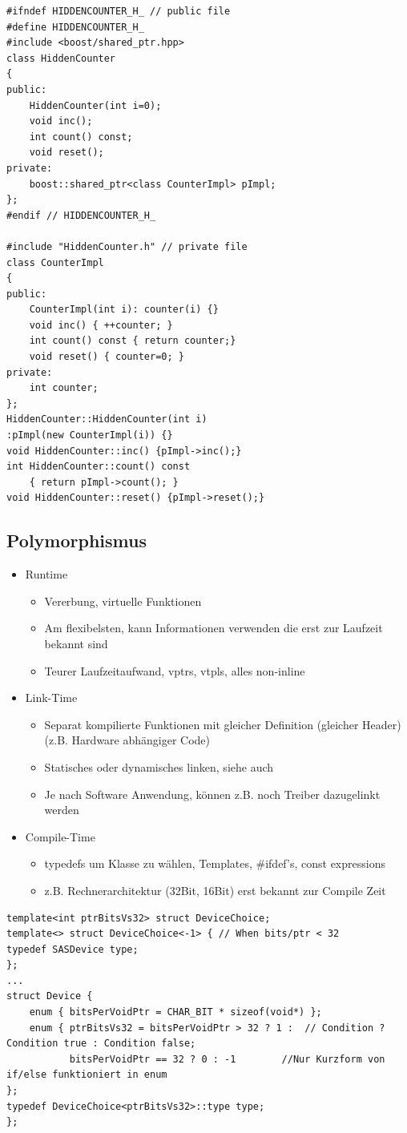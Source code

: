 \begin{lstlisting}
#ifndef HIDDENCOUNTER_H_ // public file
#define HIDDENCOUNTER_H_
#include <boost/shared_ptr.hpp>
class HiddenCounter
{
public:
	HiddenCounter(int i=0);
	void inc();
	int count() const;
	void reset();
private:
	boost::shared_ptr<class CounterImpl> pImpl;
};
#endif // HIDDENCOUNTER_H_

#include "HiddenCounter.h" // private file
class CounterImpl
{
public:
	CounterImpl(int i): counter(i) {}
	void inc() { ++counter; }
	int count() const { return counter;}
	void reset() { counter=0; }
private:
	int counter;
};
HiddenCounter::HiddenCounter(int i)
:pImpl(new CounterImpl(i)) {}
void HiddenCounter::inc() {pImpl->inc();}
int HiddenCounter::count() const
	{ return pImpl->count(); }
void HiddenCounter::reset() {pImpl->reset();}
\end{lstlisting}






\subsection{Polymorphismus}
\begin{itemize}
	\item Runtime
		\begin{itemize}
			\item Vererbung, virtuelle Funktionen
			\item Am flexibelsten, kann Informationen verwenden die erst zur Laufzeit bekannt sind
			\item Teurer Laufzeitaufwand, vptrs, vtpls, alles non-inline
		\end{itemize}
	\item Link-Time
		\begin{itemize}
			\item Separat kompilierte Funktionen mit gleicher Definition (gleicher Header) (z.B.
				Hardware abhängiger Code)
			\item Statisches oder dynamisches linken, siehe auch 
			\item Je nach Software Anwendung, können z.B. noch Treiber dazugelinkt werden
		\end{itemize}
	\item Compile-Time
		\begin{itemize}
			\item typedefs um Klasse zu wählen, Templates, \#ifdef's, const expressions
			\item z.B. Rechnerarchitektur (32Bit, 16Bit) erst bekannt zur Compile Zeit
		\end{itemize}
\end{itemize}
\begin{lstlisting}
template<int ptrBitsVs32> struct DeviceChoice;
template<> struct DeviceChoice<-1> { // When bits/ptr < 32
typedef SASDevice type;
};
...
struct Device {
    enum { bitsPerVoidPtr = CHAR_BIT * sizeof(void*) };
    enum { ptrBitsVs32 = bitsPerVoidPtr > 32 ? 1 :  // Condition ? Condition true : Condition false;
           bitsPerVoidPtr == 32 ? 0 : -1        //Nur Kurzform von if/else funktioniert in enum
};
typedef DeviceChoice<ptrBitsVs32>::type type;
};
\end{lstlisting}


